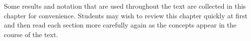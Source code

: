 
\starttitle
  [
    title=Preliminaries,
    ownnumber=0,
  ]

  Some results and notation that are used throughout the text are collected in this chapter for convenience. Students may wish to review this chapter quickly at first and then read each section more carefully again as the concepts appear in the course of the text.

  

  

  

\stoptitle
